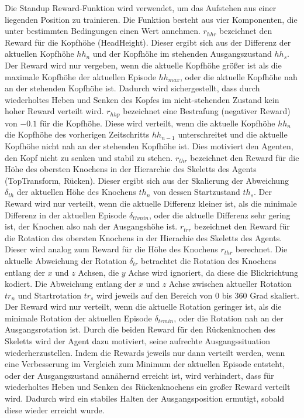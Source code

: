 
Die Standup Reward-Funktion wird verwendet, um das Aufstehen aus einer liegenden Position zu trainieren. Die Funktion besteht aus vier Komponenten, die unter bestimmten Bedingungen einen Wert annehmen. 
$r_{hhr}$ bezeichnet den Reward für die Kopfhöhe (HeadHeight). Dieser ergibt sich aus der Differenz der aktuellen Kopfhöhe $hh_n$ und der Kopfhöhe im stehenden Ausgangszustand $hh_s$. Der Reward wird nur vergeben, wenn die aktuelle Kopfhöhe größer ist als die maximale Kopfhöhe der aktuellen Episode $hh_{max}$, oder die aktuelle Kopfhöhe nah an der stehenden Kopfhöhe ist. Dadurch wird sichergestellt, dass durch wiederholtes Heben und Senken des Kopfes im nicht-stehenden Zustand kein hoher Reward verteilt wird.
$r_{hhp}$ bezeichnet eine Bestrafung (negativer Reward) von $-0.1$ für die Kopfhöhe. Diese wird verteilt, wenn die aktuelle Kopfhöhe $hh_n$ die Kopfhöhe des vorherigen Zeitschritts $hh_{n-1}$ unterschreitet und die aktuelle Kopfhöhe nicht nah an der stehenden Kopfhöhe ist. Dies motiviert den Agenten, den Kopf nicht zu senken und stabil zu stehen. 
$r_{thr}$ bezeichnet den Reward für die Höhe des obersten Knochens in der Hierarchie des Skeletts des Agents (TopTransform, Rücken). Dieser ergibt sich aus der Skalierung der Abweichung $\delta_{th}$ der aktuellen Höhe des Knochens $th_n$ von dessen Startzustand $th_s$. Der Reward wird nur verteilt, wenn die aktuelle Differenz kleiner ist, als die minimale Differenz in der aktuellen Episode $\delta_{thmin}$, oder die aktuelle Differenz sehr gering ist, der Knochen also nah der Ausgangshöhe ist.
$r_{trr}$ bezeichnet den Reward für die Rotation des obersten Knochens in der Hierachie des Skeletts des Agents. Dieser wird analog zum Reward für die Höhe des Knochens $r_{thr}$ berechnet. Die aktuelle Abweichung der Rotation $\delta_{tr}$ betrachtet die Rotation des Knochens entlang der $x$ und $z$ Achsen, die $y$ Achse wird ignoriert, da diese die Blickrichtung kodiert. Die Abweichung entlang der $x$ und $z$ Achse zwischen aktueller Rotation $tr_n$ und Startrotation $tr_s$ wird jeweils auf den Bereich von 0 bis 360 Grad skaliert. Der Reward wird nur verteilt, wenn die aktuelle Rotation geringer ist, als die minimale Rotation der aktuellen Episode $\delta_{trmin}$, oder die Rotation nah an der Ausgangsrotation ist.
Durch die beiden Reward für den Rückenknochen des Skeletts wird der Agent dazu motiviert, seine aufrechte Ausgangssituation wiederherzustellen. Indem die Rewards jeweils nur dann verteilt werden, wenn eine Verbesserung im Vergleich zum Minimum der aktuellen Episode entsteht, oder der Ausgangszustand annähernd erreicht ist, wird verhindert, dass für wiederholtes Heben und Senken des Rückenknochens ein großer Reward verteilt wird. Dadurch wird ein stabiles Halten der Ausgangsposition ermutigt, sobald diese wieder erreicht wurde.

